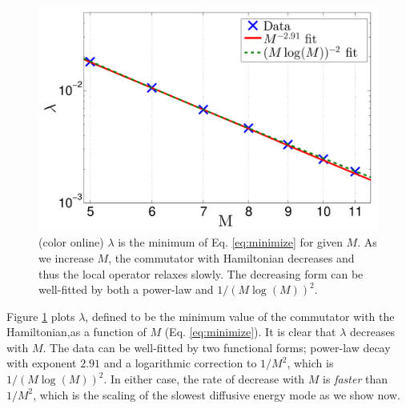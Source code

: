 \documentclass[twocolumn,superscriptaddress, prb]{revtex4-1}
\begin{document}
\begin{figure}
\includegraphics[width=1.0\linewidth]{semi_infinite_full_optimal.pdf}
\centering
\caption{(color online) $\lambda$ is the minimum of Eq. \eqref{eq:minimize} for given $M$. As we increase $M$, the commutator with Hamiltonian decreases
and thus the local operator relaxes slowly. The decreasing form can be well-fitted by both a power-law and $1/(M\log(M))^2$. }
\label{fig:full_optimal}
\end{figure}

Figure \ref{fig:full_optimal} plots $\lambda$, defined to be the minimum value of the commutator with the Hamiltonian,as a function of $M$ (Eq. \eqref{eq:minimize}).
It is clear that $\lambda$ decreases with $M$.
The data can be well-fitted by two functional forms; power-law decay with exponent $2.91$ and a logarithmic correction to $1/M^2$, which is $1/(M\log(M))^2$.
In either case,
the rate of decrease with $M$ is {\it faster} than $1/M^2$, which is the scaling of the slowest diffusive energy mode as we show now.
\end{document}
